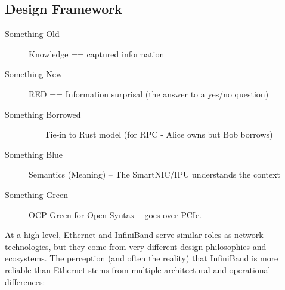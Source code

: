 \documentclass[../../../OAE-SPEC-MAIN.tex]{subfiles}
\begin{document}
\subsection{Design Framework}


\begin{description}
	\item [Something Old] Knowledge == captured information
	\item [Something New] RED == Information surprisal (the answer to a yes/no question)
	\item [Something Borrowed] == Tie-in to Rust model (for RPC - Alice owns but Bob borrows)
	\item [Something Blue] Semantics (Meaning) -- The SmartNIC/IPU understands the context
	\item [Something Green]  OCP Green for Open Syntax -- goes over PCIe. 
\end{description}



 
 
At a high level, Ethernet and InfiniBand serve similar roles as network technologies, but they come from very different design philosophies and ecosystems. The perception (and often the reality) that InfiniBand is more reliable than Ethernet stems from multiple architectural and operational differences:
\end{document}
